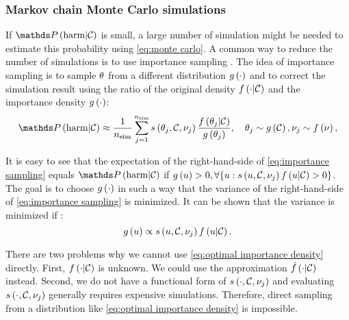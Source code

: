 \subsubsection{Markov chain Monte Carlo simulations}
\label{sec:mcmc}

If $\probabilitycond{\harm}{\scenariocategory}$ is small, a large number of simulation might be needed to estimate this probability using \cref{eq:monte carlo}. A common way to reduce the number of simulations is to use importance sampling \autocite{rubinstein2016simulation}. The idea of importance sampling is to sample $\theta$ from a different distribution $g\left( \cdot \right)$ and to correct the simulation result using the ratio of the original density $f\left(  \cdot | \mathcal{C}  \right)$ and the importance density $g\left( \cdot \right)$:
\begin{equation}
	\label{eq:importance sampling}
	\probabilitycond{\harm}{\scenariocategory} \approx 
	\frac{1}{\nsim} \sum_{\indexb=1}^{\nsim} \simulation{\parvectorscen{\indexb}, \scenariocategory, \dummystochastic_{\indexb}}
	\frac{\densitycond{\parvectorscen{\indexb}}{\scenariocategory}}{\densityimportance{\parvectorscen{\indexb}}}, \quad 
	\parvectorscen{\indexb}\sim\densityimportance{\scenariocategory},
	\dummystochastic_{\indexb}\sim\density{\dummystochastic},
\end{equation}

It is easy to see that the expectation of the right-hand-side of \cref{eq:importance sampling} equals $\probabilitycond{\harm}{\scenariocategory}$ if $g\left( u \right)>0, \forall \{u: s\left( u, \mathcal{C}, \nu_{j} \right)f\left(  u | \mathcal{C}  \right)>0\}$. The goal is to choose $g\left( \cdot \right)$ in such a way that the variance of the right-hand-side of \cref{eq:importance sampling} is minimized. It can be shown that the variance is minimized if \autocite{rubinstein2016simulation}:
\begin{equation}
	\label{eq:optimal importance density}
	g\left( u \right) \propto s\left( u, \mathcal{C}, \nu_{j} \right)f\left(  u | \mathcal{C}  \right).
\end{equation}

There are two problems why we cannot use \cref{eq:optimal importance density} directly. First, $f\left(  \cdot | \mathcal{C}  \right)$ is unknown. We could use the approximation $\hat{f}\left(  \cdot | \mathcal{C}  \right)$ instead. Second, we do not have a functional form of $s\left( \cdot, \mathcal{C}, \nu_{j} \right)$ and evaluating $s\left( \cdot, \mathcal{C}, \nu_{j} \right)$ generally requires expensive simulations. Therefore, direct sampling from a distribution like \cref{eq:optimal importance density} is impossible.

